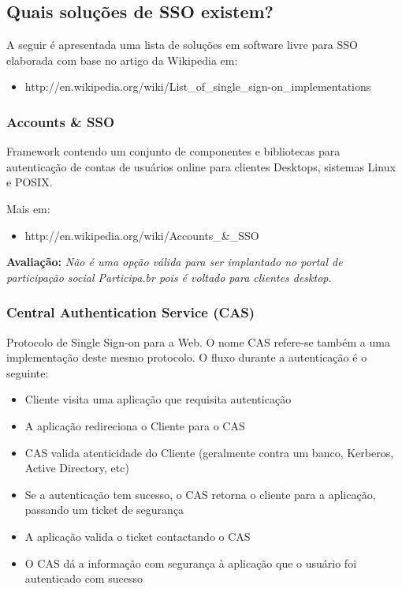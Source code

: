 \documentclass[11pt]{article}
\begin{document}
\subsection{Quais soluções de SSO existem?}

A seguir é apresentada uma lista de soluções em software livre para SSO
elaborada com base no artigo da Wikipedia em:

\begin{itemize}
  \item http://en.wikipedia.org/wiki/List\_of\_single\_sign-on\_implementations
\end{itemize}

\subsubsection{Accounts \& SSO}

Framework contendo um conjunto de componentes e bibliotecas para autenticação
de contas de usuários online para clientes Desktops, sistemas Linux e POSIX.

Mais em:
\begin{itemize}
  \item{http://en.wikipedia.org/wiki/Accounts\_\&\_SSO}
\end{itemize}

{\bf Avaliação:} {\it Não é uma opção válida para ser implantado no portal de
participação social Participa.br pois é voltado para clientes desktop.}

\subsubsection{Central Authentication Service (CAS)}

Protocolo de Single Sign-on para a Web. O nome CAS refere-se também a uma
implementação deste mesmo protocolo. O fluxo durante a autenticação é o
seguinte:

\begin{itemize}
  \item{Cliente visita uma aplicação que requisita autenticação}
  \item{A aplicação redireciona o Cliente para o CAS}
  \item{CAS valida atenticidade do Cliente (geralmente contra um banco, Kerberos, Active Directory, etc)}
  \item{Se a autenticação tem sucesso, o CAS retorna o cliente para a aplicação, passando um ticket de segurança}
  \item{A aplicação valida o ticket contactando o CAS}
  \item{O CAS dá a informação com segurança à aplicação que o usuário foi autenticado com sucesso}
\end{itemize}
\end{document}
